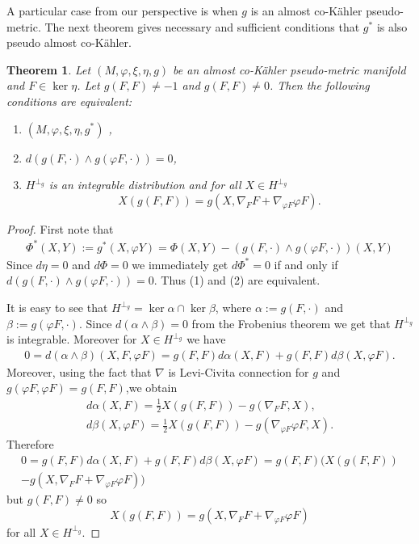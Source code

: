 \documentclass[12pt,a4paper,final]{amsart}
\numberwithin{equation}{section}
\newtheorem{tw}{Theorem}[section]
\theoremstyle{df}
\begin{document}
A particular case from our perspective is when $g$ is an almost co-K\"ahler pseudo-metric. The next theorem gives necessary and sufficient conditions that $g^{\ast}$ is also pseudo almost co-K\"ahler.
\begin{tw}\label{lm::acokequiv}
Let $(M,\varphi,\xi,\eta,g)$ be an almost co-K\"ahler pseudo-metric manifold and $F\in \ker\eta$. Let $g(F,F)\neq -1$ and $g(F,F)\neq 0$. Then the following conditions are equivalent:
\begin{enumerate}
\item $(M,\varphi,\xi,\eta,g^{\ast})$ ,
\item $d(g(F,\cdot)\wedge g(\varphi F,\cdot))=0$,
\item $H^{\perp_g}$ is an integrable distribution and for all  $X\in H^{\perp_g}$ $$X(g(F,F))=g(X,\nabla_FF+\nabla_{\varphi F}\varphi F).$$ 
\end{enumerate}
\end{tw}
\begin{proof}
First note that
\begin{align*}
\Phi ^{\ast}(X,Y):=g^{\ast}(X,\varphi Y)=\Phi (X,Y)-(g(F,\cdot)\wedge g(\varphi F,\cdot))(X,Y)
\end{align*}
Since $d\eta =0$ and $d \Phi =0$ we immediately get $d\Phi^{\ast}=0$ if and only if $d(g(F,\cdot)\wedge g(\varphi F,\cdot))=0$. Thus (1) and (2) are equivalent.
\par 
It is easy to see that $H^{\perp_g}=\ker\alpha \cap\ker\beta$, where $\alpha:=g(F,\cdot)$ and $\beta:=g(\varphi F,\cdot).$
Since $d(\alpha\wedge\beta)=0$ from the Frobenius theorem we get that $H^{\perp_g}$ is integrable. Moreover for $X\in H^{\perp_g}$ we have
\begin{align*}
0=d(\alpha\wedge\beta)(X,F,\varphi F)
=g(F,F)d\alpha(X,F)+g(F,F)d\beta(X,\varphi F).
\end{align*}
Moreover, using the fact that $\nabla$ is Levi-Civita connection for $g$ and $g(\varphi F,\varphi F)=g(F,F)$,we obtain
\begin{align*}
d\alpha(X,F)=\frac{1}{2} X(g(F,F))-g(\nabla_FF,X),\\
d\beta(X,\varphi F)=\frac{1}{2} X(g(F,F))-g(\nabla_{\varphi F}\varphi F,X).
\end{align*}
Therefore
\begin{align*}
0=g(F,F)d\alpha(X,F)+g(F,F)d\beta(X,\varphi F)=g(F,F)(X(g(F,F))\\-g(X,\nabla_FF+\nabla_{\varphi F}\varphi F))
\end{align*}
but $g(F,F)\neq 0$ so
$$
X(g(F,F))=g(X,\nabla_FF+\nabla_{\varphi F}\varphi F)
$$
for all  $X\in H^{\perp_g}$.
\end{proof}
\end{document}
